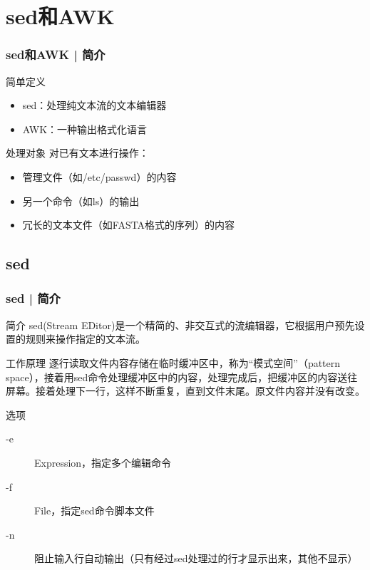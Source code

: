 \section{sed和AWK}
\begin{frame}
  \frametitle{sed和AWK | 简介}
  \begin{block}{简单定义}
    \begin{itemize}
      \item sed：处理纯文本流的文本编辑器
      \item AWK：一种输出格式化语言
    \end{itemize}
  \end{block}
  \pause
  \begin{block}{处理对象}
    对已有文本进行操作：
    \begin{itemize}
      \item 管理文件（如/etc/passwd）的内容
      \item 另一个命令（如ls）的输出
      \item 冗长的文本文件（如FASTA格式的序列）的内容
    \end{itemize}
  \end{block}
\end{frame}

\subsection{sed}
\begin{frame}
  \frametitle{sed | 简介}
  \begin{block}{简介}
    sed(Stream EDitor)是一个精简的、非交互式的流编辑器，它根据用户预先设置的规则来操作指定的文本流。
  \end{block}
  \pause
  \begin{block}{工作原理}
    逐行读取文件内容存储在临时缓冲区中，称为“模式空间”（pattern space），接着用sed命令处理缓冲区中的内容，处理完成后，把缓冲区的内容送往屏幕。接着处理下一行，这样不断重复，直到文件末尾。原文件内容并没有改变。
  \end{block}
  \pause
  \begin{block}{\alert{选项}}
    \begin{description}
      \item[-e] Expression，指定多个编辑命令
      \item[-f] File，指定sed命令脚本文件
      \item[-n] 阻止输入行自动输出（只有经过sed处理过的行才显示出来，其他不显示）
    \end{description}
  \end{block}
\end{frame}

